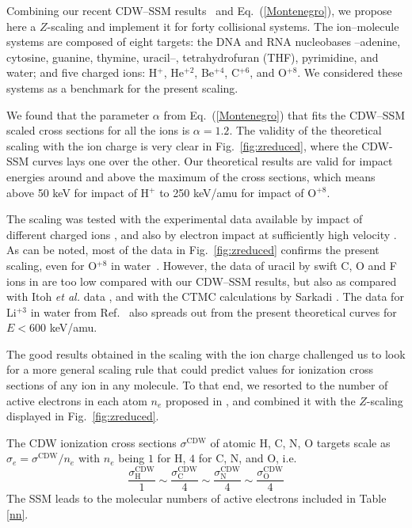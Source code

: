 \documentclass[10pt,showpacs,showkeys,twocolumn]{revtex4}
\begin{document}
Combining our recent CDW--SSM results~\cite{MendezJPB20} and 
Eq.~(\ref{Montenegro}), we propose here a $Z$-scaling and implement it 
for forty collisional systems. The ion--molecule systems are composed 
of eight targets: the DNA and RNA nucleobases --adenine, cytosine, 
guanine, thymine, uracil--, tetrahydrofuran (THF), pyrimidine, and 
water; and five charged ions: H$^+$, He$^{+2}$, Be$^{+4}$, C$^{+6}$, 
and O$^{+8}$. We considered these systems as a benchmark for the 
present scaling. 

We found that the parameter $\alpha$ from Eq.~(\ref{Montenegro}) that 
fits the CDW--SSM scaled cross sections for all the ions is $\alpha=1.2$. 
The validity of the theoretical scaling with the ion charge is very 
clear in Fig.~\ref{fig:zreduced}, where the CDW-SSM curves lays one 
over the other.  Our theoretical results are valid for impact energies 
around and above the maximum of the cross sections, which means above 
50 keV for impact of H$^+$  to 250 keV/amu for impact of O$^{+8}$. 

The scaling was tested with the experimental data available by impact 
of different charged ions \cite{itoh2013,iriki2011,wolff2014,wang2016,
tribedi2019,agnihotri2012,agnihotri2013,Luna2007,Rudd86,Rudd85,
Luna_Li_water,DalCappello2009,Tribedi_O_water}, and also by electron 
impact at sufficiently high velocity \cite{rahman2016,bug2017,wolf2019,
fuss2009}. As can be noted, most of the data in Fig.~\ref{fig:zreduced} 
confirms the present scaling, even for O$^{+8}$ in 
water~\cite{Tribedi_O_water}. However, the data of uracil by swift C, 
O and F ions in \cite{agnihotri2012,agnihotri2013} are too low compared 
with our CDW--SSM results, but also as compared with Itoh 
\textit{et al.} data \cite{itoh2013}, and with the CTMC calculations by 
Sarkadi \cite{sarkadi2016}. The data for Li$^{+3}$ in water from 
Ref.~\cite{Luna_Li_water} also spreads out from the present theoretical 
curves for $E<600$ keV/amu.

The good results obtained in the scaling with the ion charge challenged 
us to look for a more general scaling rule that could predict values 
for ionization cross sections of any ion in any molecule. To that end, 
we resorted to the number of active electrons in each atom $n_e$ 
proposed in \cite{MendezJPB20}, and combined it with the $Z$-scaling 
displayed in Fig.~\ref{fig:zreduced}.

The CDW ionization cross sections $\sigma^{\mathrm{CDW}}$ of atomic H, 
C, N, O targets scale as $\sigma_e=\sigma^{\mathrm{CDW}}/n_e$ with 
$n_e$ being $1$ for H, $4$ for C, N, and O, i.e.
\begin{equation}
 \frac{\sigma_{\mathrm{H}}^{\mathrm{CDW}}}{1}\sim
 \frac{\sigma_{\mathrm{C}}^{\mathrm{CDW}}}{4}\sim
 \frac{\sigma_{\mathrm{N}}^{\mathrm{CDW}}}{4}\sim
 \frac{\sigma_{\mathrm{O}}^{\mathrm{CDW}}}{4}
\end{equation}
The SSM leads to the molecular numbers of active electrons included in 
Table \ref{nn}.
\end{document}
